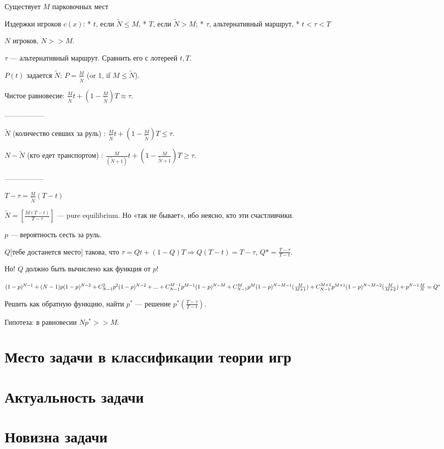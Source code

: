 \documentclass[]{report}
\begin{document}
Существует $M$ парковочных мест

Издержки игроков $c(x)$:
 * $t$, если $\tilde N\le M$,
 * $T$, если $\tilde N>M$;
 * $\tau$, альтернативный маршрут,
 * $t<\tau<T$

$N$ игроков, $N >> M$.

$\tau$ — альтернативный маршрут. Сравнить его с лотереей ${t,T}$.

$P(t)$ задается $\tilde N$: $P=\frac{M}{\tilde{N}}$ (or $1$, if $M \le \tilde N$).

Чистое равновесие: $\frac{M}{\tilde N}t+(1-\frac{M}{\tilde{N}})T\approx\tau$.

-----------------

$\tilde{N}$ (количество севших за руль) : $\frac{M}{\tilde{N}}t+(1-\frac{M}{\tilde{N}})T\le\tau$.

${N-\tilde N}$ (кто едет транспортом) : $\frac{M}{(\tilde{N}+1)}t+(1-\frac{M}{\tilde{N}+1})T\ge\tau$.

-----------------

$T-\tau = \frac{M}{\tilde{N}}(T-t)$

$\tilde{N}=[\frac{M(T-t)}{T-\tau}]$ — pure equilibrium. Но «так не бывает», ибо неясно, кто эти счастливчики.

$p$ — вероятность сесть за руль.

$Q$[тебе достанется место] такова, что $\tau = Qt+(1-Q)T \Rightarrow Q(T-t)=T-\tau$, $Q*=\frac{T-\tau}{T-t}$.

Но! $Q$ должно быть вычислено как функция от $p$!

$(1-p)^{N-1} + \\ (N-1)p(1-p)^{N-2} + \\ C_{N-1}^2 p^2(1-p)^{N-2} + ... + \\ C_{N-1}^{M-1}p^{M-1}(1-p)^{N-M} + \\ C_{N-1}^{M}p^M(1-p)^{N-M-1}(\frac{M}{M+1}) + \\ C_{N-1}^{M+1}p^{M+1}(1-p)^{N-M-2}(\frac{M}{M+2}) + \\ p^{N-1}\frac{M}{N} = \\ Q^*$

Решить как обратную функцию, найти $p^*$ — решение $p^*(\frac{T-\tau}{T-t})$.

Гипотеза: в равновесии $Np^* >> M$.

\section{Место задачи в классификации теории игр}

\section{Актуальность задачи}

\section{Новизна задачи}
\end{document}
